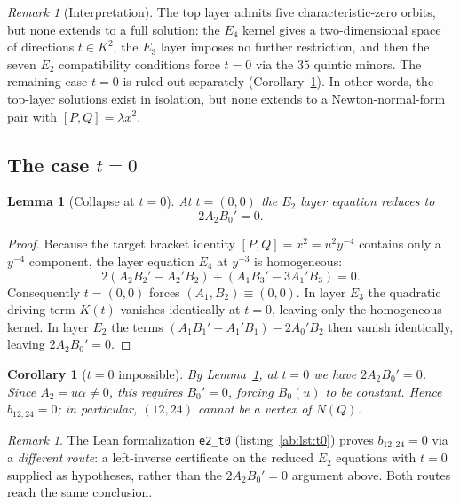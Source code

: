 \documentclass[a4paper,11pt]{article}
\theoremstyle{plain}
\newtheorem{lemma}[theorem]{Lemma}
\newtheorem{corollary}[theorem]{Corollary}
\theoremstyle{definition}
\theoremstyle{remark}
\newtheorem{remark}[theorem]{Remark}
\begin{document}
\begin{remark}[Interpretation]
The top layer admits five characteristic-zero orbits, but none extends to a full solution: the $E_4$ kernel gives a two-dimensional space of directions $t\in K^2$, the $E_3$ layer imposes no further restriction, and then the seven $E_2$ compatibility conditions force $t=0$ via the $35$ quintic minors. The remaining case $t=0$ is ruled out separately (Corollary~\ref{ab:cor:t0}). In other words, the top-layer solutions exist in isolation, but none extends to a Newton-normal-form pair with $[P,Q]=\lambda x^2$.
\end{remark}

\subsection{\texorpdfstring{The case $t=0$}{The case t=0}}

\begin{lemma}[Collapse at $t=0$]\label{ab:lem:t0-collapse}
At $t=(0,0)$ the $E_2$ layer equation reduces to
\[
2A_2B_0'=0.
\]
\end{lemma}
\begin{proof}
Because the target bracket identity $[P,Q]=x^2=u^2y^{-4}$ contains only a $y^{-4}$ component, the layer equation $E_4$ at $y^{-3}$ is homogeneous:
\[
2(A_2B_2'-A_2'B_2)+(A_1B_3'-3A_1'B_3)=0.
\]
Consequently $t=(0,0)$ forces $(A_1,B_2)\equiv(0,0)$. In layer $E_3$ the quadratic driving term $K(t)$ vanishes identically at $t=0$, leaving only the homogeneous kernel. In layer $E_2$ the terms $(A_1B_1'-A_1'B_1)-2A_0'B_2$ then vanish identically, leaving $2A_2B_0'=0$.
\end{proof}

\begin{corollary}[$t=0$ impossible]\label{ab:cor:t0}
By Lemma~\ref{ab:lem:t0-collapse}, at $t=0$ we have $2A_2B_0'=0$. Since $A_2=u\alpha\neq0$, this requires $B_0'=0$, forcing $B_0(u)$ to be constant. Hence $b_{12,24}=0$; in particular, $(12,24)$ cannot be a vertex of $N(Q)$.
\end{corollary}

\begin{remark}
The Lean formalization \texttt{e2\_t0} (listing~\ref{ab:lst:t0}) proves $b_{12,24}=0$ via a \emph{different route}: a left-inverse certificate on the reduced $E_2$ equations with $t=0$ supplied as hypotheses, rather than the $2A_2B_0'=0$ argument above. Both routes reach the same conclusion.
\end{remark}
\end{document}

